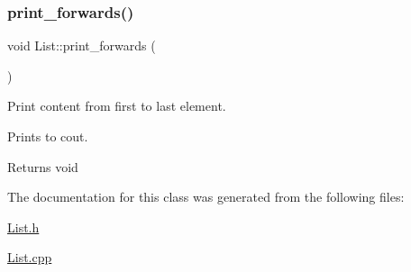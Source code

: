 \subsubsection{\texorpdfstring{print\+\_\+forwards()}{print\_forwards()}}
{\footnotesize\ttfamily void List\+::print\+\_\+forwards (\begin{DoxyParamCaption}{ }\end{DoxyParamCaption})}



Print content from first to last element. 

Prints to cout.

\begin{DoxyReturn}{Returns}
void 
\end{DoxyReturn}


The documentation for this class was generated from the following files\+:\begin{DoxyCompactItemize}
\item 
\hyperlink{_list_8h}{List.\+h}\item 
\hyperlink{_list_8cpp}{List.\+cpp}\end{DoxyCompactItemize}
